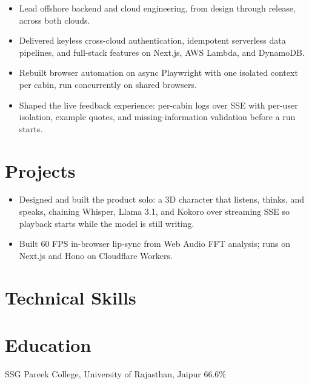 \documentclass[10pt,a4paper]{article}
\begin{document}
\begin{itemize}
  \item Lead offshore backend and cloud engineering, from design through release, across both clouds.
  \item Delivered keyless cross-cloud authentication, idempotent serverless data pipelines, and full-stack features on Next.js, AWS Lambda, and DynamoDB.
\end{itemize}

\vspace{4pt}

\begin{itemize}
  \item Rebuilt browser automation on async Playwright with one isolated context per cabin, run concurrently on shared browsers.
  \item Shaped the live feedback experience: per-cabin logs over SSE with per-user isolation, example quotes, and missing-information validation before a run starts.
\end{itemize}

\section{Projects}
\begin{itemize}
  \item Designed and built the product solo: a 3D character that listens, thinks, and speaks, chaining Whisper, Llama 3.1, and Kokoro over streaming SSE so playback starts while the model is still writing.
  \item Built 60 FPS in-browser lip-sync from Web Audio FFT analysis; runs on Next.js and Hono on Cloudflare Workers.
\end{itemize}

\section{Technical Skills}

\section{Education}
SSG Pareek College, University of Rajasthan, Jaipur \textbar{} 66.6\%\par
\end{document}
